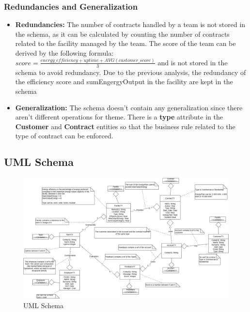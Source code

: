 \subsubsection{Redundancies and Generalization}
\begin{itemize}
    \item \textbf{Redundancies:} The number of contracts handled by a team is not stored in the schema, as it can be calculated by counting the number of contracts related to the facility managed by the team. The score of the team can be derived by the following formula: $score = \frac{energy\_efficiency + uptime + AVG(customer\_score)}{3}$ and is not stored in the schema to avoid redundancy. Due to the previous analysis, the redundancy of the efficiency score and sumEngergyOutput in the facility are kept in the schema
    \item \textbf{Generalization:} The schema doesn't contain any generalization since there aren't different operations for theme. There is a \textbf{type} attribute in the \textbf{Customer} and \textbf{Contract} entities so that the business rule related to the type of contract can be enforced.
\end{itemize}


\subsection{UML Schema}

\begin{figure}[H]
    \centering
    \includegraphics[width=\textwidth]{images/UML.png}
    \caption{UML Schema}
\end{figure}
